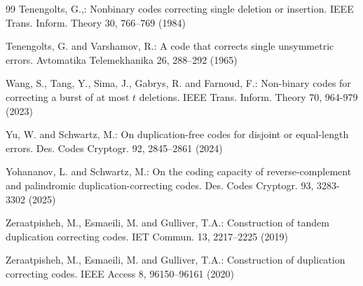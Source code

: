 \documentclass[pdflatex,sn-mathphys-num]{sn-jnl}
\theoremstyle{theorem}%
\theoremstyle{definition}
\theoremstyle{construction}
\newtheorem{open problem}{Open problem}
\begin{document}
\begin{thebibliography}{99}
	Tenengolts,	G.,: Nonbinary codes correcting single deletion or insertion. IEEE Trans. Inform. Theory 30, 766–769 (1984)
	
 	Tenengolts,	G. and Varshamov, R.: A code that corrects single
	unsymmetric errors. Avtomatika Telemekhanika 26, 288–292 (1965)
	
		Wang, S., Tang, Y., Sima, J., Gabrys, R. and Farnoud, F.: Non-binary codes for correcting a burst of at most $t$ deletions. IEEE Trans. Inform. Theory 70, 964-979 (2023)
		
		Yu, W. and Schwartz, M.: 
		On duplication-free codes for disjoint or equal-length errors. 
		Des. Codes Cryptogr. 92, 2845–2861 (2024)
		
		Yohananov, L. and Schwartz, M.: On the coding capacity of reverse-complement and palindromic duplication-correcting codes. Des.  Codes Cryptogr. 93, 3283-3302 (2025)
		
		Zeraatpisheh, M., Esmaeili, M. and Gulliver, T.A.:
		Construction of tandem duplication correcting codes. 
		IET Commun. 13, 2217–2225 (2019)
		
		Zeraatpisheh, M., Esmaeili, M. and Gulliver, T.A.:
		Construction of duplication correcting codes. 
		IEEE Access 8, 96150–96161 (2020)
	\end{thebibliography}
\end{document}
